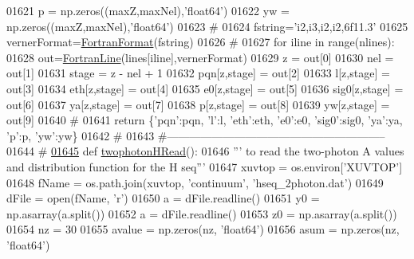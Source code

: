 \begin{DoxyCode}
{{{{{{{{{{{{{{{01621     p = np.zeros((maxZ,maxNel),\textcolor{stringliteral}{'float64'})
01622     yw = np.zeros((maxZ,maxNel),\textcolor{stringliteral}{'float64'})
01623     \textcolor{comment}{#}
01624     fstring=\textcolor{stringliteral}{'i2,i3,i2,i2,6f11.3'}
01625     vernerFormat=\hyperlink{classpyneb_1_1utils_1_1_fortran_format_1_1_fortran_format}{FortranFormat}(fstring)
01626     \textcolor{comment}{#}
01627     \textcolor{keywordflow}{for} iline \textcolor{keywordflow}{in} range(nlines):
01628         out=\hyperlink{classpyneb_1_1utils_1_1_fortran_format_1_1_fortran_line}{FortranLine}(lines[iline],vernerFormat)
01629         z = out[0]
01630         nel = out[1]
01631         stage = z - nel + 1
01632         pqn[z,stage] = out[2]
01633         l[z,stage] = out[3]
01634         eth[z,stage] = out[4]
01635         e0[z,stage] = out[5]
01636         sig0[z,stage] = out[6]
01637         ya[z,stage] = out[7]
01638         p[z,stage] = out[8]
01639         yw[z,stage] = out[9]
01640     \textcolor{comment}{#}
01641     \textcolor{keywordflow}{return} \{\textcolor{stringliteral}{'pqn'}:pqn, \textcolor{stringliteral}{'l'}:l, \textcolor{stringliteral}{'eth'}:eth, \textcolor{stringliteral}{'e0'}:e0, \textcolor{stringliteral}{'sig0'}:sig0, \textcolor{stringliteral}{'ya'}:ya, \textcolor{stringliteral}{'p'}:p, \textcolor{stringliteral}{'yw'}:yw\}
01642     \textcolor{comment}{#}
01643     \textcolor{comment}{#-----------------------------------------------------------}
01644     \textcolor{comment}{#}
\hypertarget{__chianti__tools_8py_source_l01645}{}\hyperlink{namespacepyneb_1_1utils_1_1__chianti__tools_ae03bdc8f81142c34a58f9567f3359322}{01645} \textcolor{keyword}{def }\hyperlink{namespacepyneb_1_1utils_1_1__chianti__tools_ae03bdc8f81142c34a58f9567f3359322}{twophotonHRead}():
01646     \textcolor{stringliteral}{''' to read the two-photon A values and distribution function for the H seq'''}
01647     xuvtop = os.environ[\textcolor{stringliteral}{'XUVTOP'}]
01648     fName = os.path.join(xuvtop, \textcolor{stringliteral}{'continuum'}, \textcolor{stringliteral}{'hseq\_2photon.dat'})
01649     dFile = open(fName, \textcolor{stringliteral}{'}\textcolor{stringliteral}{r')}
01650 \textcolor{stringliteral}{    a = dFile.readline()}
01651 \textcolor{stringliteral}{    y0 = np.asarray(a.split())}
01652 \textcolor{stringliteral}{    a = dFile.readline()}
01653 \textcolor{stringliteral}{    z0 = np.asarray(a.split())}
01654 \textcolor{stringliteral}{    nz = 30}
01655 \textcolor{stringliteral}{    avalue = np.zeros(nz, }\textcolor{stringliteral}{'float64'})
01656     asum = np.zeros(nz, \textcolor{stringliteral}{'float64'})
}}}}}}}}}}}}}}}
\end{DoxyCode}
